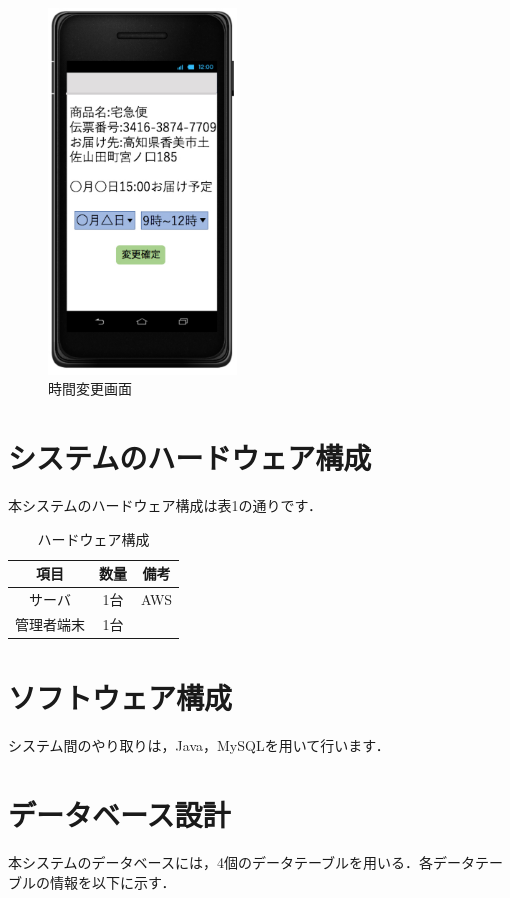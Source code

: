 \documentclass[a4j,titlepage]{jarticle}
\begin{document}
\begin{figure}[htbp]
 \begin{center}
  \includegraphics[width=50mm]{time_change.pdf}
	\caption{時間変更画面}
	\label{fig:time_change}
 \end{center}

\end{figure}

\section{システムのハードウェア構成}
本システムのハードウェア構成は表1の通りです．
\begin{table}[htbp]
\begin{center}
 \caption{ハードウェア構成}
  \begin{tabular}{|c|c|c|}\hline
    項目 & 数量 & 備考\\ \hline \hline
    サーバ & 1台 & AWS\\ \hline
    管理者端末 & 1台 & \\ \hline
  \end{tabular}
\end{center}
\end{table}


\section{ソフトウェア構成}
システム間のやり取りは，Java，MySQLを用いて行います．

\section{データベース設計}
本システムのデータベースには，4個のデータテーブルを用いる．各データテーブルの情報を以下に示す．
\end{document}

